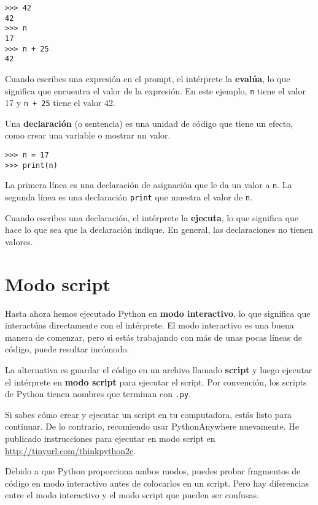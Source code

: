 \documentclass[12pt,letterpaper]{book}
\begin{document}
\begin{lstlisting}
>>> 42
42
>>> n
17
>>> n + 25
42
\end{lstlisting}

Cuando escribes una expresión en el prompt, el intérprete la \textbf{evalúa}, lo que significa que encuentra el valor de la expresión. En este ejemplo, \texttt{n} tiene el valor 17 y \texttt{n + 25} tiene el valor 42.

Una \textbf{declaración} (o sentencia) es una unidad de código que tiene un efecto, como crear una variable o mostrar un valor.

\begin{lstlisting}
>>> n = 17
>>> print(n)
\end{lstlisting}

La primera línea es una declaración de asignación que le da un valor a \texttt{n}. La segunda línea es una declaración \texttt{print} que muestra el valor de \texttt{n}.

Cuando escribes una declaración, el intérprete la \textbf{ejecuta}, lo que significa que hace lo que sea que la declaración indique. En general, las declaraciones no tienen valores.

\section{Modo script}

Hasta ahora hemos ejecutado Python en \textbf{modo interactivo}, lo que significa que interactúas directamente con el intérprete. El modo interactivo es una buena manera de comenzar, pero si estás trabajando con más de unas pocas líneas de código, puede resultar incómodo.

La alternativa es guardar el código en un archivo llamado \textbf{script} y luego ejecutar el intérprete en \textbf{modo script} para ejecutar el script. Por convención, los scripts de Python tienen nombres que terminan con \texttt{.py}.

Si sabes cómo crear y ejecutar un script en tu computadora, estás listo para continuar. De lo contrario, recomiendo usar PythonAnywhere nuevamente. He publicado instrucciones para ejecutar en modo script en \url{http://tinyurl.com/thinkpython2e}.

Debido a que Python proporciona ambos modos, puedes probar fragmentos de código en modo interactivo antes de colocarlos en un script. Pero hay diferencias entre el modo interactivo y el modo script que pueden ser confusas.
\end{document}
